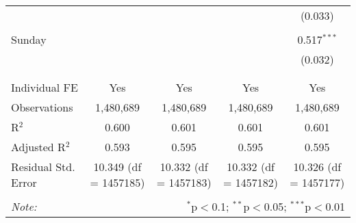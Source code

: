\documentclass[
]{article}
\begin{document}
\begin{table}[!htbp]
{\begin{tabular}{@{\extracolsep{5pt}}lcccc}
  &  &  &  & (0.033) \\ 
  & & & & \\ 
 Sunday &  &  &  & 0.517$^{***}$ \\ 
  &  &  &  & (0.032) \\ 
  & & & & \\ 
\hline \\[-1.8ex] 
Individual FE & Yes & Yes & Yes & Yes \\ 
Observations & 1,480,689 & 1,480,689 & 1,480,689 & 1,480,689 \\ 
R$^{2}$ & 0.600 & 0.601 & 0.601 & 0.601 \\ 
Adjusted R$^{2}$ & 0.593 & 0.595 & 0.595 & 0.595 \\ 
Residual Std. Error & 10.349 (df = 1457185) & 10.332 (df = 1457183) & 10.332 (df = 1457182) & 10.326 (df = 1457177) \\ 
\hline 
\hline \\[-1.8ex] 
\textit{Note:}  & \multicolumn{4}{r}{$^{*}$p$<$0.1; $^{**}$p$<$0.05; $^{***}$p$<$0.01} \\ 
\end{tabular}
} 
\end{table} 
\newpage
\end{document}
